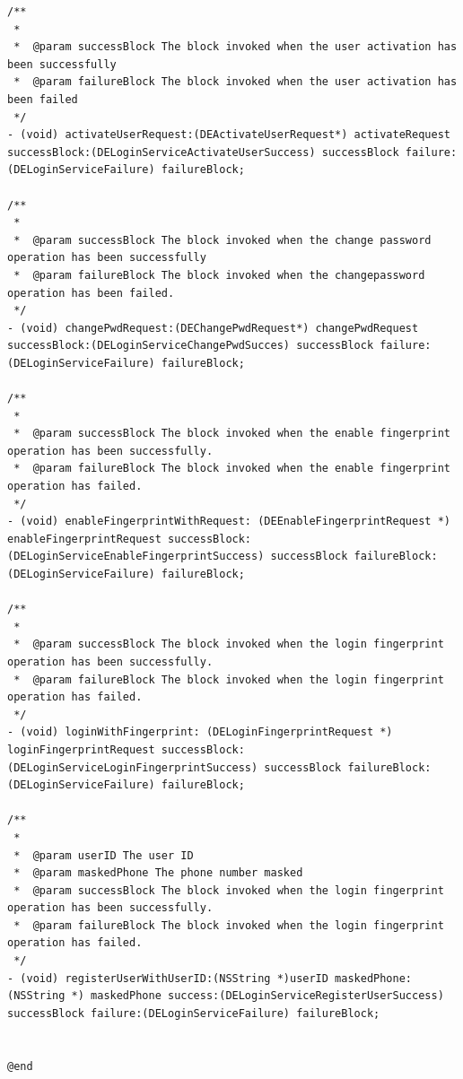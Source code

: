 \documentclass[a4paper, 12pt]{article}
\newenvironment{code}{\captionsetup{type=listing}}{}
\begin{document}
\begin{code}
\begin{verbatim}
/**
 *
 *  @param successBlock The block invoked when the user activation has been successfully
 *  @param failureBlock The block invoked when the user activation has been failed
 */
- (void) activateUserRequest:(DEActivateUserRequest*) activateRequest successBlock:(DELoginServiceActivateUserSuccess) successBlock failure:(DELoginServiceFailure) failureBlock;

/**
 *
 *  @param successBlock The block invoked when the change password operation has been successfully
 *  @param failureBlock The block invoked when the changepassword operation has been failed.
 */
- (void) changePwdRequest:(DEChangePwdRequest*) changePwdRequest successBlock:(DELoginServiceChangePwdSucces) successBlock failure:(DELoginServiceFailure) failureBlock;

/**
 *
 *  @param successBlock The block invoked when the enable fingerprint operation has been successfully.
 *  @param failureBlock The block invoked when the enable fingerprint operation has failed.
 */
- (void) enableFingerprintWithRequest: (DEEnableFingerprintRequest *) enableFingerprintRequest successBlock:(DELoginServiceEnableFingerprintSuccess) successBlock failureBlock:(DELoginServiceFailure) failureBlock;

/**
 *
 *  @param successBlock The block invoked when the login fingerprint operation has been successfully.
 *  @param failureBlock The block invoked when the login fingerprint operation has failed.
 */
- (void) loginWithFingerprint: (DELoginFingerprintRequest *) loginFingerprintRequest successBlock:(DELoginServiceLoginFingerprintSuccess) successBlock failureBlock:(DELoginServiceFailure) failureBlock;

/**
 *
 *  @param userID The user ID
 *  @param maskedPhone The phone number masked
 *  @param successBlock The block invoked when the login fingerprint operation has been successfully.
 *  @param failureBlock The block invoked when the login fingerprint operation has failed.
 */
- (void) registerUserWithUserID:(NSString *)userID maskedPhone:(NSString *) maskedPhone success:(DELoginServiceRegisterUserSuccess) successBlock failure:(DELoginServiceFailure) failureBlock;


@end

\end{verbatim}
\end{code}
\bigbreak
\end{document}

